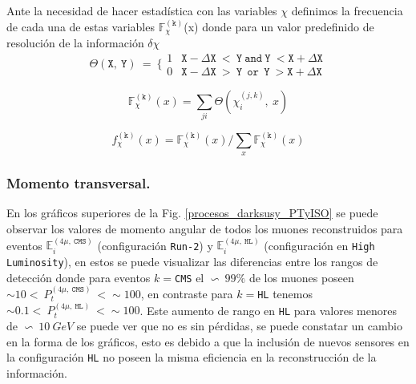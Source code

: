 Ante la necesidad de hacer estadística con las variables $\chi$ definimos la frecuencia de cada una de estas variables $\mathbb{F}_\chi^{(\mathtt{k})}$(x) donde para un valor predefinido de resolución de la información $\delta \chi$
\begin{equation}
\mathtt{\Theta(X,~Y)} ~ = ~ \Bigg\{\begin{matrix}
1 & \mathtt{X-\Delta X ~<~Y ~and~Y~ < X+\Delta X}\\
0 & \mathtt{X-\Delta X ~>~Y ~~or~~Y~ > X+\Delta X}
\end{matrix} 
\end{equation}

\begin{equation}
\mathbb{F}_\chi^{(\mathtt{k})} (x)= \sum_{ji} \mathtt{\Theta}(\chi_i^{(j,k)},~x)
\end{equation}

\begin{equation}
f_\chi^{(\mathtt{k})} (x)= \mathbb{F}_\chi^{(\mathtt{k})} (x)/ \sum_x \mathbb{F}_\chi^{(\mathtt{k})} (x)
\end{equation}



\subsubsection{Momento transversal.}
En los gráficos superiores de la Fig. \ref{procesos_darksusy_PTyISO} se puede observar los valores de momento angular de todos los muones reconstruidos para eventos $\mathbb{E}_i^{(4\mu,~\mathtt{CMS})}$ (configuración \texttt{Run-2}) y $\mathbb{E}_i^{(4\mu,~\mathtt{HL})}$ (configuración en \texttt{High Luminosity}), en estos se puede visualizar las diferencias entre los rangos de detección donde para eventos $k=$\texttt{CMS} el $\backsim ~ 99\%$ de los muones poseen $\sim 10  < ~ P_t^{(4\mu,~\mathtt{CMS})} ~ <\sim 100$, en contraste para $k=$\texttt{HL} tenemos $\sim 0.1 < ~ P_t^{(4\mu,~\mathtt{HL})} ~ < \sim 100$. Este aumento de rango en \texttt{HL} para valores menores de $\backsim ~ 10~GeV$ se puede ver que no es sin pérdidas, se puede constatar un cambio en la forma de los gráficos, esto es debido a que la inclusión de nuevos sensores en la configuración \texttt{HL} no poseen la misma eficiencia en la reconstrucción de la información.

